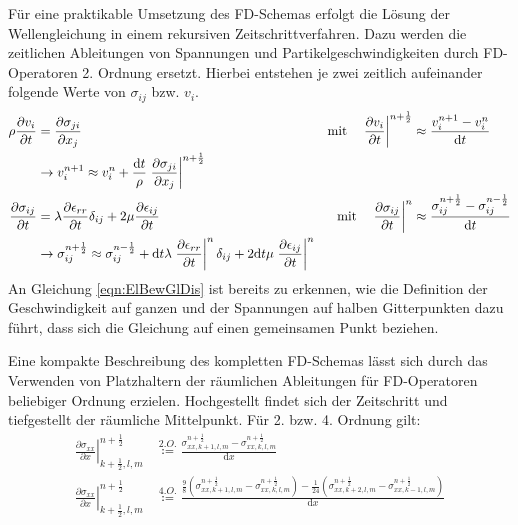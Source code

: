 \documentclass[pdftex,a4paper,parskip,listof=totoc,bibliography=totoc,onehalfspacing,12pt]{scrreprt}
\begin{document}
Für eine praktikable Umsetzung des FD-Schemas erfolgt die Lösung der Wellengleichung in einem rekursiven Zeitschrittverfahren. Dazu werden die zeitlichen Ableitungen von Spannungen und Partikelgeschwindigkeiten durch FD-Operatoren 2. Ordnung ersetzt. Hierbei entstehen je zwei zeitlich aufeinander folgende Werte von $\sigma_{ij}$ bzw. $v_i$.
\begin{align}
	\rho \frac{\partial v_i}{\partial t} &= \frac{\partial \sigma_{ji}}{\partial x_j} ~ &\text{mit} \quad \left.\frac{\partial v_i}{\partial t}\right\rvert^{n+\frac{1}{2}} &\approx \frac{v_i^{n+1} - v_i^{n}}{\mathrm{d}t}\notag\\
	&\rightarrow v_i^{n+1} \approx v_i^n + \frac{\mathrm{d}t}{\rho}  \left.\frac{\partial \sigma_{ji}}{\partial x_j}\right\rvert^{n+\frac{1}{2}}\label{eqn:ElBewGlDis}\\
	\frac{\partial \sigma_{ij}}{\partial t} &= \lambda \frac{\partial \epsilon_{rr}}{\partial t} \delta_{ij} + 2 \mu \frac{\partial \epsilon_{ij}}{\partial t} ~ &\text{mit} \quad \left.\frac{\partial \sigma_{ij}}{\partial t}\right\rvert^n &\approx \frac{\sigma_{ij}^{n+\frac{1}{2}} - \sigma_{ij}^{n-\frac{1}{2}}}{\mathrm{d}t}\notag\\
	&\rightarrow \sigma_{ij}^{n+\frac{1}{2}} \approx \sigma_{ij}^{n-\frac{1}{2}} + \mathrm{d}t \lambda \left.\frac{\partial \epsilon_{rr}}{\partial t}\right\rvert^n \delta_{ij} + 2 \mathrm{d}t \mu \left.\frac{\partial \epsilon_{ij}}{\partial t}\right\rvert^n
\end{align}
An Gleichung \ref{eqn:ElBewGlDis} ist bereits zu erkennen, wie die Definition der Geschwindigkeit auf ganzen und der Spannungen auf halben Gitterpunkten dazu führt, dass sich die Gleichung auf einen gemeinsamen Punkt beziehen.

Eine kompakte Beschreibung des kompletten FD-Schemas lässt sich durch das Verwenden von Platzhaltern der räumlichen Ableitungen für FD-Operatoren beliebiger Ordnung erzielen. Hochgestellt findet sich der Zeitschritt und tiefgestellt der räumliche Mittelpunkt. Für 2. bzw. 4. Ordnung gilt:
\begin{align}
	\left.\frac{\partial\sigma_{xx}}{\partial x}\right\rvert_{k+\frac{1}{2},l,m}^{n+\frac{1}{2}} &\overset{2.O.}{\coloneqq} \frac{\sigma_{xx,k+1,l,m}^{n+\frac{1}{2}} - \sigma_{xx,k,l,m}^{n+\frac{1}{2}}}{\mathrm{d}x}\label{eqn:FDO2O}\\
	\left.\frac{\partial\sigma_{xx}}{\partial x}\right\rvert_{k+\frac{1}{2},l,m}^{n+\frac{1}{2}} &\overset{4.O.}{\coloneqq} \frac{\frac{9}{8}\left(\sigma_{xx,k+1,l,m}^{n+\frac{1}{2}} - \sigma_{xx,k,l,m}^{n+\frac{1}{2}}\right) - \frac{1}{24}\left(\sigma_{xx,k+2,l,m}^{n+\frac{1}{2}} - \sigma_{xx,k-1,l,m}^{n+\frac{1}{2}}\right)}{\mathrm{d}x}
\end{align}
\end{document}
